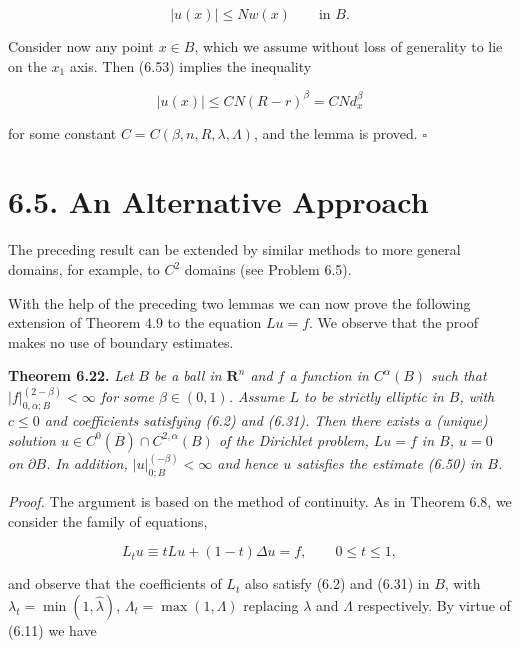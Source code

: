 \[
\tag{6.53}
\lvert u(x)\rvert\le Nw(x)\qquad\text{in }B.
\]

\begin{flushleft}
Consider now any point $x\in B$, which we assume without loss of generality to
lie on the $x_1$ axis. Then (6.53) implies the inequality
\end{flushleft}

\[
\lvert u(x)\rvert\le CN(R-r)^\beta = CNd_x^\beta
\]

\begin{flushleft}
for some constant $C = C(\beta,n,R,\lambda,\Lambda)$, and the lemma is proved. $\square$
\end{flushleft}



\section*{6.5. An Alternative Approach}

The preceding result can be extended by similar methods to more general
domains, for example, to \(C^{2}\) domains (see Problem 6.5).

With the help of the preceding two lemmas we can now prove the following
extension of Theorem 4.9 to the equation \(Lu=f\). We observe that the proof makes
no use of boundary estimates.

\textbf{Theorem 6.22.} \emph{Let \(B\) be a ball in \(\mathbf{R}^{n}\) and \(f\) a function in
\(C^{\alpha}(B)\) such that \(|f|_{0,\alpha;B}^{(2-\beta)}<\infty\) for some \(\beta\in(0,1)\).
Assume \(L\) to be strictly elliptic in \(B\), with \(c\le 0\) and coefficients
satisfying (6.2) and (6.31). Then there exists a (unique) solution \(u\in C^{0}(\overline{B})\cap C^{2,\alpha}(B)\)
of the Dirichlet problem, \(Lu=f\) in \(B\), \(u=0\) on \(\partial B\). In addition, \(|u|_{0;B}^{(-\beta)}<\infty\) and hence
\(u\) satisfies the estimate (6.50) in \(B\).}

\medskip

\textit{Proof.} The argument is based on the method of continuity. As in Theorem 6.8,
we consider the family of equations,

\[
L_{t}u \equiv tLu+(1-t)\Delta u=f,\qquad 0\le t\le 1,
\]

and observe that the coefficients of \(L_{t}\) also satisfy (6.2) and (6.31) in \(B\), with
\(\lambda_{t}=\min(1,\hat{\lambda})\), \(\Lambda_{t}=\max(1,\Lambda)\) replacing \(\lambda\) and \(\Lambda\) respectively. By virtue of (6.11) we
have

